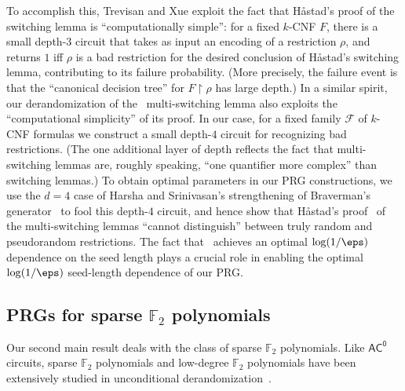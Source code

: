 \documentclass{toc}
\theoremstyle{plain}
\newcommand{\acz}{\mathsf{AC^0}}
\newcommand{\uhr}{\upharpoonright}
\renewcommand{\F}{\mathds{F}}
\begin{document}
To accomplish this, Trevisan and Xue exploit the fact that H{\aa}stad's proof of the switching lemma is ``computationally simple'': for a fixed $k$-CNF $F$, there is a small depth-$3$ circuit that takes as input an encoding of a restriction $\rho$, and returns $1$ iff $\rho$ is a bad restriction for the desired conclusion of H{\aa}stad's switching lemma, contributing to its failure probability.
%
(More precisely,   %
the failure event is that the ``canonical decision tree'' for $F \uhr \rho$ has large depth.)   %
In
a  %
similar spirit, our derandomization of the~\cite{Has14} multi-switching lemma also exploits the ``computational simplicity'' of its proof. In our case, for a fixed family $\mathscr{F}$ of $k$-CNF formulas we construct a small depth-$4$ circuit for recognizing bad restrictions.
%
(The one  %
additional layer of depth reflects the fact that multi-switching lemmas are, roughly speaking, ``one quantifier more complex'' than switching lemmas.)   %
To obtain optimal parameters in our PRG constructions, we use the $d=4$ case of Harsha and Srinivasan's strengthening of Braverman's generator~\cite{HS16journal} to fool this depth-$4$ circuit, and hence show %
that H{\aa}stad's proof~\cite{Has14}   %
of the multi-switching lemmas ``cannot distinguish'' between truly random and pseudorandom restrictions. The fact that~\cite{HS16journal}
achieves an optimal $\log(1/\eps)$ 
%
%
%
%
%
dependence on the seed length %
plays a crucial role in enabling the optimal 
$\log(1/\eps)$ %
seed-length %
dependence of our PRG. 
%
%


\subsection{PRGs for sparse $\F_2$ polynomials} \label{sec:F2}

Our second main result deals with the class of sparse $\F_2$ polynomials.  Like $\acz$ circuits, sparse $\F_2$ polynomials and low-degree $\F_2$ polynomials have been extensively studied in unconditional derandomization~\cite{NN93,AGHP92,LVW93,Bog05,Vio06,Lov09,Vio09,BV10,LS11,Lu12,CHLT19}.   
\end{document}
